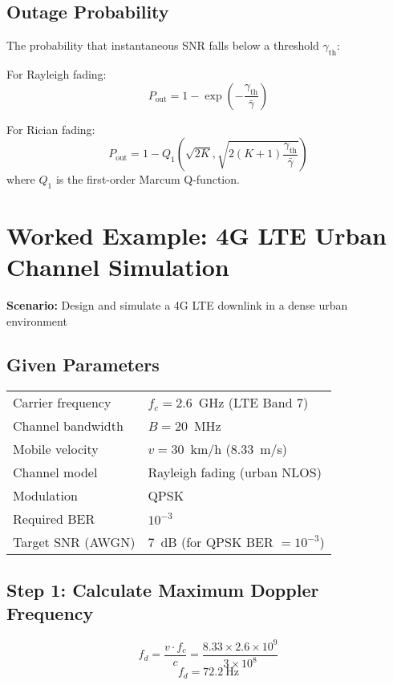 \subsection{Outage Probability}

The probability that instantaneous SNR falls below a threshold $\gamma_{\text{th}}$:

For Rayleigh fading:
\begin{equation}
P_{\text{out}} = 1 - \exp\left(-\frac{\gamma_{\text{th}}}{\bar{\gamma}}\right)
\end{equation}

For Rician fading:
\begin{equation}
P_{\text{out}} = 1 - Q_1\left(\sqrt{2K}, \sqrt{2(K+1)\frac{\gamma_{\text{th}}}{\bar{\gamma}}}\right)
\end{equation}
where $Q_1$ is the first-order Marcum Q-function.

\section{Worked Example: 4G LTE Urban Channel Simulation}

\textbf{Scenario:} Design and simulate a 4G LTE downlink in a dense urban environment

\subsection*{Given Parameters}

\begin{tabular}{@{}ll@{}}
Carrier frequency & $f_c = 2.6$~GHz (LTE Band 7) \\
Channel bandwidth & $B = 20$~MHz \\
Mobile velocity & $v = 30$~km/h (8.33~m/s) \\
Channel model & Rayleigh fading (urban NLOS) \\
Modulation & QPSK \\
Required BER & $10^{-3}$ \\
Target SNR (AWGN) & 7~dB (for QPSK BER $= 10^{-3}$) \\
\end{tabular}

\subsection*{Step 1: Calculate Maximum Doppler Frequency}

\begin{equation}
f_d = \frac{v \cdot f_c}{c} = \frac{8.33 \times 2.6 \times 10^9}{3 \times 10^8}
\end{equation}
\begin{equation}
f_d = 72.2~\text{Hz}
\end{equation}

